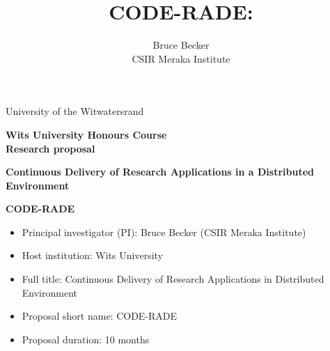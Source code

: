 \documentclass[oneside, a4paper, onecolumn, 11pt]{article}
\title{CODE-RADE:\\ }
\author{Bruce Becker\\ CSIR Meraka Institute}
\begin{document}
\noindent
University of the Witwatersrand

\vfill

\begin{center}
\large{\textbf{Wits University Honours Course\\
Research proposal }
}
\vfill

\LARGE{\textbf{Continuous Delivery of Research Applications in a Distributed Environment }}

\vfill

\LARGE{\textbf{CODE-RADE}}

\vfill

\end{center}

\vfill

\begin{itemize}
\item Principal investigator (PI): Bruce Becker (CSIR Meraka Institute)
\item Host institution: Wits University
\item Full title: Continuous Delivery of Research Applications in Distributed Environment 
\item Proposal short name: CODE-RADE
\item Proposal duration: 10 months
\end{itemize}
	

\vfill
\end{document}
